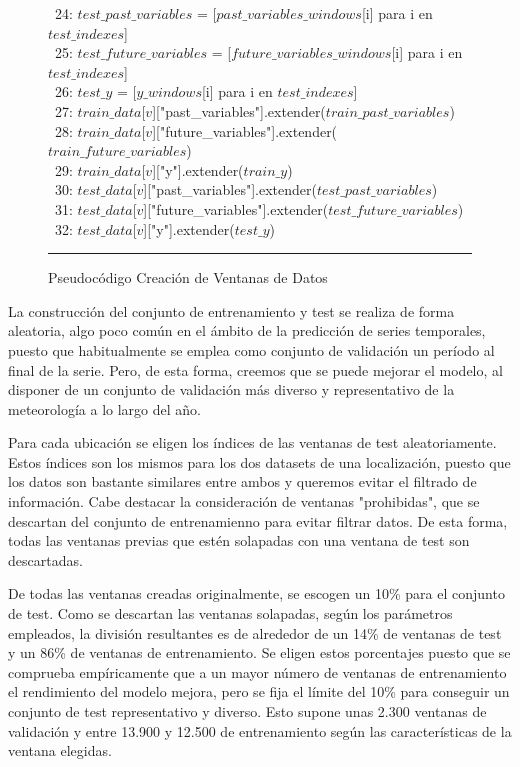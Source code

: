 \begin{figure}[H]
{\begin{center}
\begin{tabbing}
\ 24: \> \> \> $test\_past\_variables$ = [$past\_variables\_windows$[i] para i en $test\_indexes$] \\
\ 25: \> \> \> $test\_future\_variables$ = [$future\_variables\_windows$[i] para i en $test\_indexes$] \\
\ 26: \> \> \> $test\_y$ = [$y\_windows$[i] para i en $test\_indexes$] \\
      
\ 27: \> \> \> $train\_data$[$v$]["past\_variables"].extender($train\_past\_variables$) \\
\ 28: \> \> \> $train\_data$[$v$]["future\_variables"].extender($train\_future\_variables$) \\
\ 29: \> \> \> $train\_data$[$v$][\string"y"].extender($train\_y$) \\
        
\ 30: \> \> \> $test\_data$[$v$]["past\_variables"].extender($test\_past\_variables$) \\
\ 31: \> \> \> $test\_data$[$v$]["future\_variables"].extender($test\_future\_variables$) \\
\ 32: \> \> \> $test\_data$[$v$][\string"y"].extender($test\_y$) \\

\end{tabbing}
\end{center}
\hrule
}
\caption{Pseudocódigo Creación de Ventanas de Datos}
\label{code_data_windows}
\end{figure}

La construcción del conjunto de entrenamiento y test se realiza de forma aleatoria, algo poco común en el ámbito de la predicción de series temporales, puesto que habitualmente 
se emplea como conjunto de validación un período al final de la serie. Pero, de esta forma, creemos que se puede mejorar el modelo, al disponer de un conjunto de validación
más diverso y representativo de la meteorología a lo largo del año.

Para cada ubicación se eligen los índices de las ventanas de test aleatoriamente. Estos índices son los mismos para los dos datasets de una localización, 
puesto que los datos son bastante similares entre ambos y queremos evitar el filtrado de información. 
Cabe destacar la consideración de ventanas "prohibidas", que se descartan del conjunto de entrenamienno para evitar filtrar datos.
De esta forma, todas las ventanas previas que estén solapadas con una ventana de test son descartadas.

De todas las ventanas creadas originalmente, se escogen un 10\% para el conjunto de test. Como se descartan las ventanas solapadas, según los parámetros empleados, la división resultantes
es de alrededor de un 14\% de ventanas de test y un 86\% de ventanas de entrenamiento. Se eligen estos porcentajes puesto que se comprueba empíricamente que a un mayor número de 
ventanas de entrenamiento el rendimiento del modelo mejora, pero se fija el límite del 10\% para conseguir un conjunto de test representativo y diverso. Esto supone unas 2.300 ventanas
de validación y entre 13.900 y 12.500 de entrenamiento según las características de la ventana elegidas. 

